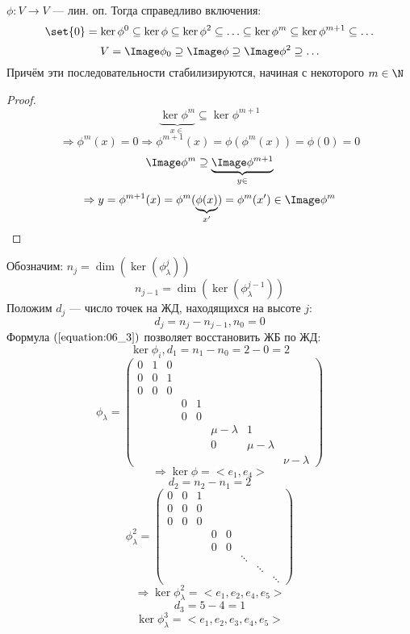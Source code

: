 \begin{statement}
\label{statement:06_1}
$\phi \colon V \rightarrow V$ --- лин. оп. Тогда справедливо включения:
\[
    \set{0} = \ker \phi^{0} \subseteq \ker \phi \subseteq \ker \phi^{2} \subseteq \ldots \subseteq \ker \phi^{m} \subseteq \ker \phi^{m + 1} \subseteq \ldots
\]
\[
    V = \Image \phi_0 \supseteq \Image \phi \supseteq \Image \phi^{2} \supseteq \ldots 
\]
Причём эти последовательности стабилизируются, начиная с некоторого $m \in \N$
\end{statement}
\begin{proof}
    \[
    \underbrace{\ker \phi^{m}}_{x \in} \subseteq \ker \phi^{m + 1}
    \]
    \[
    \Rightarrow  \phi^{m}(x) = 0 \Rightarrow \phi^{m + 1} (x) = \phi(\phi^{m}(x)) = \phi(0) = 0
    \]
    \[
    \Image \phi^{m} \supseteq \underbrace{\Image \phi^{m + 1}}_{y \in}
    \]
    \[
    \Rightarrow y = \phi^{m + 1}(x) = \phi^{m}(\underbrace{\phi(x)}_{x'}) = \phi^{m}(x') \in \Image \phi^{m}
    \]
\end{proof}
Обозначим: $n_j = \dim(\ker(\phi_{\lambda}^{j}))$
\[
    n_{j - 1} = \dim(\ker(\phi_{\lambda}^{j - 1}))
\]
Положим $d_j$ --- число точек на ЖД, находящихся на высоте $j$:
\begin{equation}
    \label{equation:06_3}
    d_j = n_j - n_{j - 1}, n_0 = 0
\end{equation}
Формула $(\ref{equation:06_3})$ позволяет восстановить ЖБ по ЖД:
\[
\ker \phi_i, d_1 = n_1 - n_0 = 2 - 0 = 2
\]
\[
    \phi_\lambda = \begin{pmatrix} 0 & 1 & 0 \\ 0 & 0 & 1 \\ 0 & 0 & 0 \\ & & & 0 & 1 \\ & & & 0 & 0 \\ & & & & & \mu - \lambda & 1 \\ & & & & & 0 & \mu - \lambda \\ & & & & & & & \nu - \lambda \end{pmatrix}
\]
\[
    \Rightarrow \ker \phi = <e_1, e_4> 
\]
\[
    d_2 = n_2 - n_1 = 2
\]
\[
    \phi_\lambda^{2} =  \begin{pmatrix} 0 & 0 & 1 \\ 0 & 0 & 0 \\ 0 & 0 & 0 \\ & & & 0 & 0 \\ & & & 0 & 0 \\ & & & & & \ddots \\ & & & & &  & \ddots \\ & & & & & & & \ddots \end{pmatrix}
\]
\[
    \Rightarrow \ker \phi_{\lambda}^{2} = <e_1, e_2, e_4, e_5>
\]
\[
    d_3 = 5 - 4 = 1
\]
\[
\ker \phi_{\lambda}^{3} = <e_1, e_2, e_3, e_4, e_5>
\]
